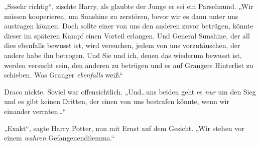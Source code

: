 „Sssehr richtig“, zischte Harry, als glaubte der Junge er sei ein Parselmund. „Wir müssen kooperieren, um Sunshine zu zerstören, bevor wir es dann unter uns austragen können. Doch sollte einer von uns den anderen zuvor betrügen, könnte dieser im späteren Kampf einen Vorteil erlangen. Und General Sunshine, der all dies ebenfalls bewusst ist, wird versuchen, jedem von uns vorzutäuschen, der andere habe ihn betrogen. Und Sie und ich, denen das wiederum bewusst ist, werden versucht sein, den anderen zu betrügen und es auf Grangers Hinterlist zu schieben. Was Granger \emph{ebenfalls} weiß.“

Draco nickte. Soviel war offensichtlich. „Und…uns beiden geht es \emph{nur} um den Sieg und es gibt keinen Dritten, der einen von uns bestrafen könnte, wenn wir einander verraten…“

„Exakt“, sagte Harry Potter, nun mit Ernst auf dem Gesicht. „Wir stehen vor einem \emph{wahren} Gefangenendilemma.“

